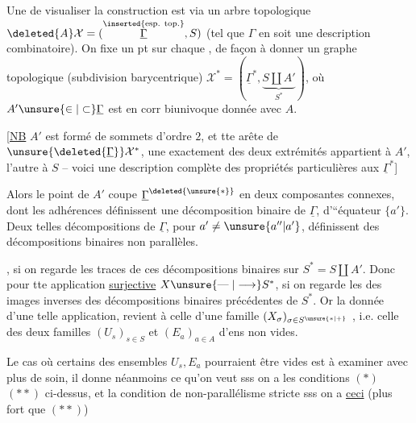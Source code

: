 Une  de visualiser la construction est via un arbre topologique $\deleted{A}\mathcal{X}=(\overset{\text{\inserted{esp. top.}}}{\underline{\Gamma}},S)$ (tel que $\Gamma$ en soit une description combinatoire). On fixe un pt sur chaque , de façon à donner un graphe topologique (subdivision barycentrique) $\mathcal{X}^{\ast}=(\underline{\Gamma}^{\ast},\underbrace{S\amalg A'}_{S^{\ast}})$, où $A'\unsure{\in|\subset}\underline{\Gamma}$ est en corr biunivoque donnée avec  $A$.

 [\uline{NB} $A'$ est formé de  sommets d'ordre $2$, et  tte arête de $\unsure{\deleted{\underline{\Gamma}}}\mathcal{X}^{\ast}$, une exactement des deux extrémités appartient à $A'$, l'autre à $S$ -- voici une description complète des propriétés particulières aux $\underline{\Gamma}^{\ast}$]

Alors le point  de $A'$ coupe $\underline{\Gamma}^{\deleted{\unsure{\ast}}}$ en deux composantes connexes, dont les adhérences définissent une décomposition binaire de $\underline{\Gamma}$, d'``équateur $\{a'\}$. Deux telles décompositions  de $\underline{\Gamma}$, pour $a'\ne\unsure{a''|a'}$, définissent des décompositions binaires  non parallèles.

, si on regarde les traces de ces décompositions binaires sur $S^\ast=S\amalg A'$. Donc pour tte application \uline{surjective} $X\unsure{\mathrel{\text{---}}|\longrightarrow}S^\ast$, si on regarde les des images inverses des décompositions binaires précédentes de $S^\ast$. Or la donnée d'une telle application, revient à celle d'une famille $(X_\sigma)_{\sigma\in S^{\unsure{\ast|+}}}$ , i.e.  celle des deux familles $(U_s)_{s\in S}$ et $(E_a)_{a\in A}$ d'ens non vides.

Le cas où certains des ensembles $U_s,E_a$ pourraient être vides est à examiner avec plus de soin, il donne néanmoins ce qu'on veut sss on a les conditions $(\ast)$ $(\ast\ast)$ ci-dessus, et la condition de non-parallélisme stricte sss on a \uline{ceci} (plus fort que $(\ast\ast)$)

